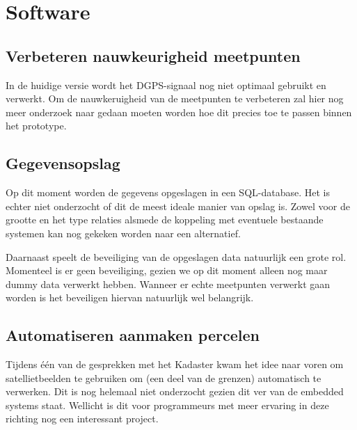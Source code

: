 \section{Software}

\subsection{Verbeteren nauwkeurigheid meetpunten}
In de huidige versie wordt het DGPS-signaal nog niet optimaal gebruikt en verwerkt.
Om de nauwkeruigheid van de meetpunten te verbeteren zal hier nog meer onderzoek
naar gedaan moeten worden hoe dit precies toe te passen binnen het prototype.

\subsection{Gegevensopslag}
Op dit moment worden de gegevens opgeslagen in een SQL-database. Het is echter
niet onderzocht of dit de meest ideale manier van opslag is. Zowel voor de grootte
en het type relaties alsmede de koppeling met eventuele bestaande systemen kan
nog gekeken worden naar een alternatief.

Daarnaast speelt de beveiliging van de opgeslagen data natuurlijk een grote rol.
Momenteel is er geen beveiliging, gezien we op dit moment alleen nog maar dummy data
verwerkt hebben. Wanneer er echte meetpunten verwerkt gaan worden is het beveiligen
hiervan natuurlijk wel belangrijk.

\subsection{Automatiseren aanmaken percelen}
Tijdens één van de gesprekken met het Kadaster kwam het idee naar voren om
satellietbeelden te gebruiken om (een deel van de grenzen) automatisch te verwerken.
Dit is nog helemaal niet onderzocht gezien dit ver van de embedded systems staat.
Wellicht is dit voor programmeurs met meer ervaring in deze richting nog een
interessant project.
